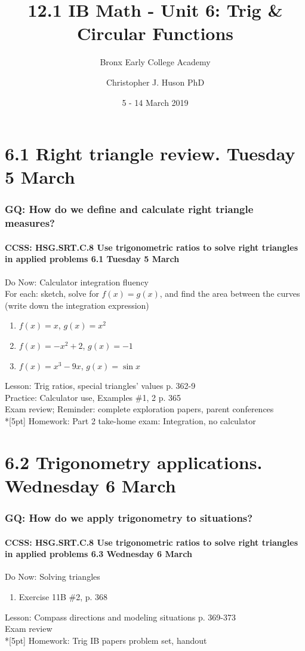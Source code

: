 \documentclass{beamer}
\title{12.1 IB Math - Unit 6: Trig \& Circular Functions}
\subtitle{Bronx Early College Academy}
\author{Christopher J. Huson PhD}
\date{5 - 14 March 2019}
\begin{document}
\frame{\titlepage}

\section[Outline]{}
\frame{\tableofcontents}

\section{6.1 Right triangle review. Tuesday 5 March}
  \frame
  {
    \frametitle{GQ: How do we define and calculate right triangle measures?}
    \framesubtitle{CCSS: HSG.SRT.C.8 Use trigonometric ratios to solve right triangles in applied problems \hfill \alert{6.1 Tuesday 5 March}}

    \begin{block}{Do Now: Calculator integration fluency\\For each: sketch, solve for $f(x)=g(x)$, and find the area between the curves (write down the integration expression)}
      \begin{enumerate}
        \item $f(x)=x$, $g(x)=x^2$
        \item $f(x)=-x^2+2$, $g(x)=-1$
        \item $f(x)=x^3-9x$, $g(x)=\sin x$
      \end{enumerate}
      \end{block}
    Lesson: Trig ratios, special triangles' values p. 362-9\\
    Practice: Calculator use, Examples \#1, 2  p. 365\\
    Exam review;
    Reminder: complete exploration papers, \alert{parent conferences} \\*[5pt]
    Homework: Part 2 take-home exam: Integration, no calculator
  }

\section{6.2 Trigonometry applications. Wednesday 6 March}
  \frame
  {
    \frametitle{GQ: How do we apply trigonometry to situations?}
    \framesubtitle{CCSS: HSG.SRT.C.8 Use trigonometric ratios to solve right triangles in applied problems \hfill \alert{6.3 Wednesday 6 March}}

    \begin{block}{Do Now: Solving triangles}
    \begin{enumerate}
        \item Exercise 11B \#2, p. 368
    \end{enumerate}
    \end{block}
    Lesson: Compass directions and modeling situations p. 369-373\\
    Exam review\\*[5pt]
    Homework: Trig IB papers problem set, handout
  }
\end{document}
